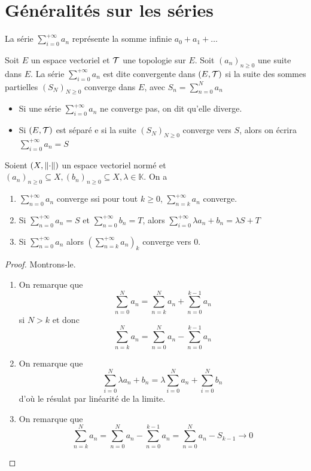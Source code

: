 \section{Généralités sur les séries}
\begin{notation}
    La série $\sum_{i = 0}^{+\infty}a_n$ représente la somme infinie $a_0+a_1+\ldots$
\end{notation}
\begin{definition}
    Soit $E$ un espace vectoriel et $\mathcal{T}$ une topologie sur $E$. Soit $(a_n)_{n\ge 0}$ une suite dans $E$. La série $\sum_{i = 0}^{+\infty}a_n$ est dite convergente dans $(E,\mathcal{T})$ si la suite des sommes partielles $(S_N)_{N\ge 0}$ converge dans $E$, avec $S_n =\sum_{n=0}^Na_n$
\end{definition}
\begin{remarque}
    \begin{itemize}
        \item Si une série $\sum_{i = 0}^{+\infty}a_n$ ne converge pas, on dit qu'elle diverge.
        \item Si $(E,\mathcal{T})$ est séparé e si la suite $(S_N)_{N\ge 0}$ converge vers $S$, alors on écrira $\sum_{i = 0}^{+\infty}a_n =S$
    \end{itemize}
\end{remarque}
\begin{proposition}
    Soient $(X,\left\| \cdot \right\|)$ un espace vectoriel normé et $(a_n)_{n\ge 0}\subseteq X,(b_n)_{n\ge 0}\subseteq X,\lambda\in\mathbb K$.
    On a \begin{enumerate}
        \item $\sum_{n = 0}^{+\infty}a_n$ converge ssi pour tout $k\ge 0$, $\sum_{n = k}^{+\infty}a_n$ converge.
        \item Si $\sum_{n = 0}^{+\infty}a_n = S$ et $\sum_{n = 0}^{+\infty}b_n = T$, alors $\sum_{i = 0}^{+\infty}\lambda a_n+b_n = \lambda S + T$
        \item Si $\sum_{n = 0}^{+\infty}a_n$ alors $\left(\sum_{n = k}^{+\infty}a_n\right)_k$ converge vers $0$.
    \end{enumerate}
\end{proposition}
\begin{proof}Montrons-le.
    \begin{enumerate}
        \item On remarque que $$\sum_{n = 0}^Na_n = \sum_{n = k}^Na_n + \sum_{n = 0}^{k-1}a_n  $$ si $N>k$ et donc $$\sum_{n = k}^Na_n = \sum_{n = 0}^Na_n-\sum_{n = 0}^{k-1}a_n $$
        \item On remarque que $$\sum_{i = 0}^N\lambda a_n+b_n = \lambda \sum_{i = 0}^Na_n+\sum_{i = 0}^Nb_n$$ d'où le résulat par linéarité de la limite.
        \item On remarque que $$\sum_{n = k}^Na_n = \sum_{n = 0}^Na_n-\sum_{n = 0}^{k-1}a_n  = \sum_{n = 0}^Na_n-S_{k-1}\to 0 $$
    \end{enumerate}
\end{proof}
